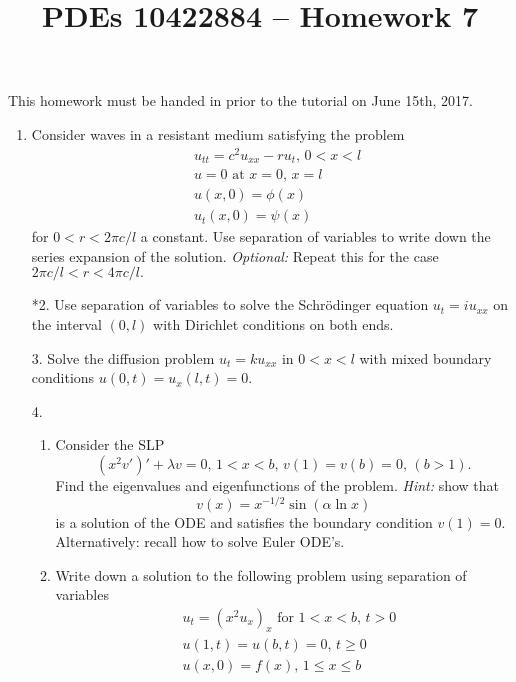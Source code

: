 \documentclass[10pt,a4paper]{article}
\title{PDEs 10422884 – Homework 7}
\date{}
\begin{document}
\maketitle


This homework must be handed in prior to the tutorial on June 15th,
2017. 
\begin{enumerate}
\item Consider waves in a resistant medium satisfying the problem
\begin{align*}
& u_{tt} = c^2 u_{xx} - r u_t, \, 0 < x < l \\
& u = 0 \text{ at } x = 0, \, x = l \\
& u(x,0) = \phi(x)\\
& u_t(x,0) = \psi(x)
\end{align*}
for $0 < r < 2 \pi c /l$ a constant. Use separation of variables to write down the series expansion of the solution. \emph{Optional:} Repeat this for the case $2 \pi c/l < r < 4 \pi c/l.$
\item[*2.] Use separation of variables to solve the Schr\"odinger equation $u_t = iu_{xx}$ on the interval $(0,l)$ with Dirichlet conditions on both ends.
\item[3.] Solve the diffusion problem $u_t = k u_{xx}$ in $0<x<l$ with mixed boundary conditions $u(0,t) = u_x(l,t) = 0.$ 
\item[4.] \begin{enumerate}
\item Consider the SLP
\[ (x^2 v')' + \lambda v = 0, \, 1 < x < b, \, v(1) = v(b) = 0, \, (b>1).\]
Find the eigenvalues and eigenfunctions of the problem.
\emph{Hint:} show that
\[ v(x) = x^{-1/2} \sin(\alpha \ln x) \]
is a solution of the ODE and satisfies the boundary condition $v(1) = 0.$ Alternatively: recall how to solve Euler ODE's.
\item Write down a solution to the following problem using separation of variables
\begin{align*}
& u_t = (x^2 u_x)_x \text{ for } 1 < x< b, \, t>0 \\
& u(1,t) = u(b,t) = 0 , \, t \geq 0 \\
& u(x,0) = f(x) , \, 1 \leq x \leq b  
\end{align*}
\end{enumerate}
\end{enumerate}
\end{document}
